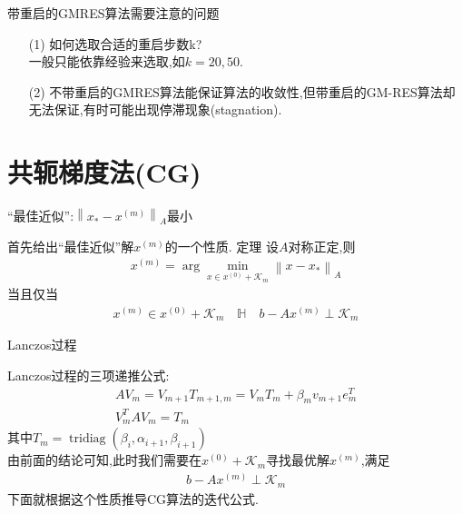 \documentclass[notheorems,serif]{beamer}
\renewcommand{\normalsize}{\wuhao}
\newcommand{\wuhao}{\fontsize{10.5pt}{\baselineskip}\selectfont}
\begin{document}
\begin{frame}


{\color{blue}\Large 带重启的GMRES算法需要注意的问题}

\quad

\normalsize
\begin{itemize}
	\item[(1)] 如何选取合适的重启步数k?\\
	{\color{blue}一般只能依靠经验来选取,如$k= 20,50$}.
	\item[(2)] 不带重启的GMRES算法能保证算法的收敛性,但带重启的GM-RES算法却无法保证,有时可能出现停滞现象(stagnation).
\end{itemize}
\end{frame}

\section{共轭梯度法(CG)}
\begin{frame}


{\color{blue}“最佳近似”:$\left\|x_{*}-x^{(m)}\right\|_{A}$最小}

首先给出“最佳近似”解$x^{(m)}$的一个性质.
{\color{blue}定理}
设$A$对称正定,则
\begin{align*}
	x^{(m)}=\arg \min _{x \in x^{(0)}+\mathcal{K}_{m}}\left\|x-x_{*}\right\|_{A}\tag{7.7}
\end{align*}
当且仅当
\begin{align*}
	x^{(m)} \in x^{(0)}+\mathcal{K}_{m} \quad \mathbb{H} \quad b-A x^{(m)} \perp \mathcal{K}_{m}
	\tag{7.8}
\end{align*}
\end{frame}

\begin{frame}


{\color{blue}\Large Lanczos过程}

\quad

\normalsize
Lanczos过程的{\color{blue}三项递推公式}:
$$
\begin{array}{l}{A V_{m}=V_{m+1} T_{m+1, m}=V_{m} T_{m}+\beta_{m} v_{m+1} e_{m}^{T}} \\ {V_{m}^{T} A V_{m}=T_{m}}\end{array}
$$
其中$T_{m}=\operatorname{tridiag}\left(\beta_{i}, \alpha_{i+1}, \beta_{i+1}\right)$\\
由前面的结论可知,此时我们需要在$x^{(0)}+\mathcal{K}_{m}$寻找最优解$x^{(m)}$,满足
\begin{align*}
	b-A x^{(m)} \perp \mathcal{K}_{m}
	\tag{7.9}
\end{align*}
下面就根据这个性质推导CG算法的迭代公式.
\end{frame}
\end{document}
